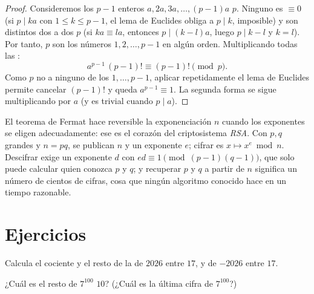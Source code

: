 \begin{proof}
Consideremos los $p - 1$ enteros $a, 2a, 3a, \dots, (p-1)a$  $p$.
Ninguno es $\equiv 0$ (si $p \mid ka$ con $1 \leq k \leq p-1$, el lema de
Euclides obliga a $p \mid k$, imposible) y son distintos dos a dos 
$p$ (si $ka \equiv la$, entonces $p \mid (k - l)a$, luego $p \mid k - l$ y
$k = l$). Por tanto,  $p$ son los números $1, 2, \dots, p-1$ en algún
orden. Multiplicando todas las :
\[
a^{p-1}\,(p-1)! \equiv (p-1)! \pmod p .
\]
Como $p$ no  a ninguno de los $1, \dots, p-1$, aplicar repetidamente
el lema de Euclides permite cancelar $(p-1)!$ y queda
$a^{p-1} \equiv 1$. La segunda forma se sigue multiplicando por $a$ (y es
trivial cuando $p \mid a$).
\end{proof}

\begin{example}\label{ex:g12:arith:rsa}
El teorema de Fermat hace reversible la exponenciación  $n$ cuando
los exponentes se eligen adecuadamente: ese es el corazón del criptosistema
\emph{RSA}. Con $p, q$  grandes y $n = pq$, se publican $n$ y un
exponente $e$; cifrar es $x \mapsto x^e \bmod n$. Descifrar exige un
exponente $d$ con $ed \equiv 1 \pmod{(p-1)(q-1)}$, que solo puede calcular
quien conozca $p$ y $q$; y recuperar $p$ y $q$ a partir de $n$ significa
 un número de cientos de cifras, cosa que ningún algoritmo
conocido hace en un tiempo razonable.
\end{example}

\section{Ejercicios}

\begin{exercise}[$\star$]\label{exo:g12:arith:1}
Calcula el cociente y el resto de la  de $2026$ entre
$17$, y de $-2026$ entre $17$.
\end{exercise}

\begin{exercise}[$\star$]\label{exo:g12:arith:2}
¿Cuál es el resto de $7^{100}$  $10$? (¿Cuál es la última cifra de
$7^{100}$?)
\end{exercise}

